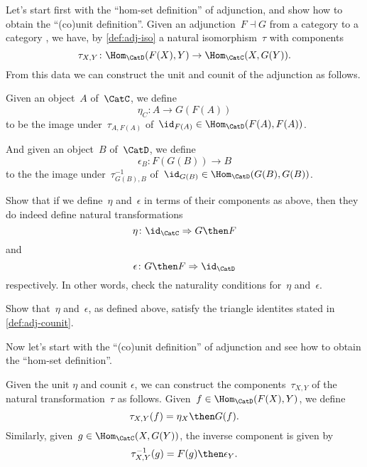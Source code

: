 Let's start first with the ``hom-set definition'' of adjunction, and show how to obtain the ``(co)unit definition''.
Given an adjunction~$F \dashv G$ from a category \CatC to a category \CatD, we have, by \cref{def:adj-iso} a natural isomorphism~$\tau$ with components
\begin{equation*}
  \tau_{X,Y} \colon \Hom_{\CatD}(F(X) ,Y ) \to \Hom_{\CatC}(X , G(Y) ).
\end{equation*}
From this data we can construct the unit and counit of the adjunction as follows.

Given an object~$A$ of~$\CatC$, we define
\begin{equation*}
  \eta_C \colon A \to G(F(A))
\end{equation*}
to be the image under~$\tau_{A, F(A)}$ of~$\id_{F(A)} \in \Hom_{\CatD}(F (A) , F(A) )$.

And given an object~$B$ of~$\CatD$, we define
\begin{equation*}
  \epsilon_B \colon F(G(B)) \to B
\end{equation*}
to the the image under~$\tau_{G(B), B}^{-1}$ of~$\id_{G(B)} \in \Hom_{\CatD}(G(B), G(B))$.

\begin{exercise}
  Show that if we define~$\eta$ and~$\epsilon$ in terms of their components as above, then they do indeed define natural transformations
  \begin{equation*}
    \eta\colon \id_{\CatC} \Rightarrow G\then F
  \end{equation*}
  and
  \begin{equation*}
    \epsilon\colon G \then F \Rightarrow \id_{\CatD}
  \end{equation*}
  respectively. In other words, check the naturality conditions for~$\eta$ and~$\epsilon$.
\end{exercise}

\begin{exercise}
  Show that~$\eta$ and~$\epsilon$, as defined above, satisfy the triangle identites stated in \cref{def:adj-counit}.
\end{exercise}

Now let's start with the ``(co)unit definition'' of adjunction and see how to obtain the ``hom-set definition''.

Given the unit $\eta$ and counit $\epsilon$, we can construct the components~$\tau_{X,Y}$ of the natural transformation~$\tau$ as follows. Given~$f \in \Hom_{\CatD}(F(X),Y)$, we define
\begin{equation*}
  \tau_{X,Y}(f) = \eta_X \then G(f).
\end{equation*}
Similarly, given~$g \in \Hom_{\CatC}(X,G(Y))$, the inverse component is given by
\begin{equation*}
  \tau_{X,Y}^{-1}(g) = F(g) \then \epsilon_Y.
\end{equation*}

